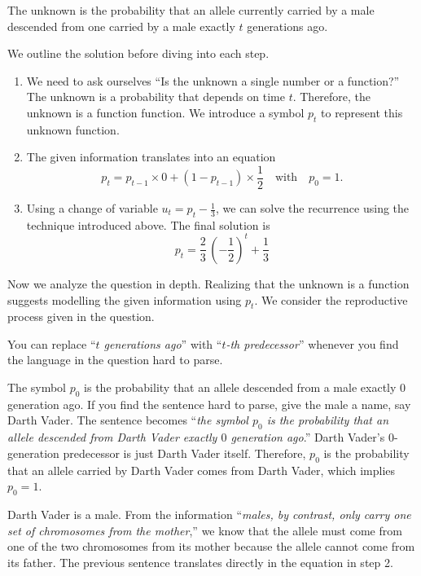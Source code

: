 \documentclass[../book.tex]{subfiles}
\begin{document}
\begin{solution}
The unknown is the probability that an allele currently carried by a male descended from one carried by a male exactly \(t\) generations ago.

We outline the solution before diving into each step.

\begin{enumerate}
  \item We need to ask ourselves ``Is the unknown a single number or a function?'' The unknown is a probability that depends on time \(t\). Therefore, the unknown is a function function.  We introduce a symbol \(p_{t}\) to represent this unknown function.
  \item The given information translates into an equation
  \begin{equation}\label{eq:models-12}
  p_{t} = p_{t-1} \times 0 + (1-p_{t-1}) \times \frac{1}{2} \quad\text{with}\quad p_{0} = 1.
  \end{equation}
  \item Using a change of variable \(u_{t} = p_{t} - \frac{1}{3}\), we can solve the recurrence using the technique introduced above. The final solution is
  \begin{equation}\label{eq:models-13}
  p_{t} = \frac{2}{3}\, \left( - \frac{1}{2}\right)^t + \frac{1}{3}
  \end{equation}
\end{enumerate}

Now we analyze the question in depth. Realizing that the unknown is a function suggests modelling the given information using \(p_{t}\).  We consider the reproductive process given in the question.

You can replace ``\emph{\(t\) generations ago}'' with ``\emph{\(t\)-th predecessor}'' whenever you find the language in the question hard to parse.

The symbol \(p_{0}\) is the probability that an allele descended from a male exactly \(0\) generation ago.  If you find the sentence hard to parse, give the male a name, say Darth Vader. The sentence becomes ``\emph{the symbol \(p_{0}\) is the probability that an allele descended from Darth Vader exactly \(0\) generation ago}.'' Darth Vader's \(0\)-generation predecessor is just Darth Vader itself. Therefore, \(p_{0}\) is the probability that an allele carried by Darth Vader comes from Darth Vader, which implies \(p_{0} = 1\).

Darth Vader is a male. From the information ``\emph{males, by contrast, only carry one set of chromosomes from the mother},'' we know that the allele must come from one of the two chromosomes from its mother because the allele cannot come from its father.  The previous sentence translates directly in the equation in step 2.


\end{solution}
\end{document}
